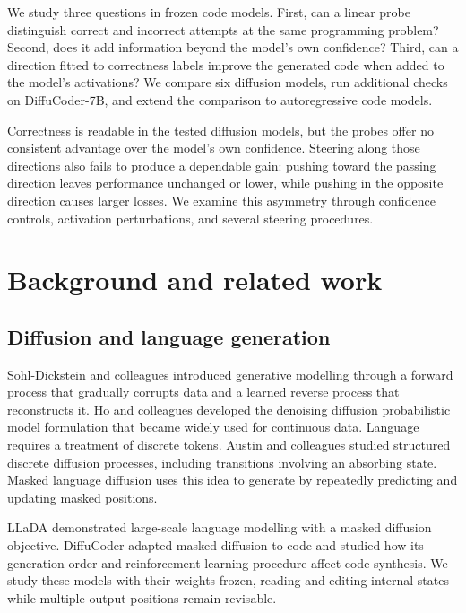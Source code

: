 \documentclass[11pt,letterpaper]{article}
\begin{document}
We study three questions in frozen code models. First, can a linear probe distinguish correct and incorrect attempts at the same programming problem? Second, does it add information beyond the model's own confidence? Third, can a direction fitted to correctness labels improve the generated code when added to the model's activations? We compare six diffusion models, run additional checks on DiffuCoder-7B, and extend the comparison to autoregressive code models.

Correctness is readable in the tested diffusion models, but the probes offer no consistent advantage over the model's own confidence. Steering along those directions also fails to produce a dependable gain: pushing toward the passing direction leaves performance unchanged or lower, while pushing in the opposite direction causes larger losses. We examine this asymmetry through confidence controls, activation perturbations, and several steering procedures.

\section{Background and related work}\label{sec:background}

\subsection{Diffusion and language generation}

Sohl-Dickstein and colleagues introduced generative modelling through a forward process that gradually corrupts data and a learned reverse process that reconstructs it.\citep{sohldickstein2015} Ho and colleagues developed the denoising diffusion probabilistic model formulation that became widely used for continuous data.\citep{ho2020} Language requires a treatment of discrete tokens. Austin and colleagues studied structured discrete diffusion processes, including transitions involving an absorbing state.\citep{austin2021} Masked language diffusion uses this idea to generate by repeatedly predicting and updating masked positions.

LLaDA demonstrated large-scale language modelling with a masked diffusion objective.\citep{nie2025} DiffuCoder adapted masked diffusion to code and studied how its generation order and reinforcement-learning procedure affect code synthesis.\citep{gong2025} We study these models with their weights frozen, reading and editing internal states while multiple output positions remain revisable.
\end{document}
